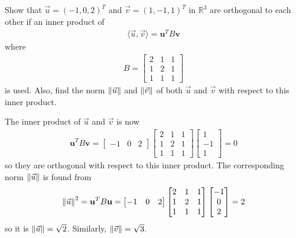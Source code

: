 \begin{Exercise}
Show that $\vec{u} = (-1,0,2)^T$ and $\vec{v} = (1,-1,1)^T$ in $\mathbb{R}^3$ are orthogonal to each other if an inner product of
\begin{align*}
\langle\vec{u}, \vec{v}\rangle = \textbf{u}^TB\textbf{v}
\end{align*}
where 
\begin{align*}
B = 
\begin{bmatrix}
2 & 1 & 1 \\
1 & 2 & 1 \\
1 & 1 & 1
\end{bmatrix}
\end{align*}
is used. Also, find the norm $\norm{\vec{u}}$ and $\norm{\vec{v}}$ of both $\vec{u}$ and $\vec{v}$ with respect to this inner product.
\end{Exercise}
\begin{Answer}
The inner product of $\vec{u}$ and $\vec{v}$ is now
\begin{align*}
\textbf{u}^TB\textbf{v} = 
\begin{bmatrix}
-1 & 0 & 2 
\end{bmatrix}
\begin{bmatrix}
2 & 1 & 1 \\
1 & 2 & 1 \\
1 & 1 & 1
\end{bmatrix}
\begin{bmatrix}
1 \\
-1 \\
1
\end{bmatrix}
= 0
\end{align*}
so they are orthogonal with respect to this inner product. The corresponding norm $\norm{\vec{u}}$ is found from
\begin{align*}
\norm{\vec{u}}^2 = \textbf{u}^TB\textbf{u} = 
\begin{bmatrix}
-1 & 0 & 2 
\end{bmatrix}
\begin{bmatrix}
2 & 1 & 1 \\
1 & 2 & 1 \\
1 & 1 & 1
\end{bmatrix}
\begin{bmatrix}
-1 \\
0 \\
2
\end{bmatrix}
= 2
\end{align*}
so it is $\norm{\vec{u}} = \sqrt{2}$. Similarly, $\norm{\vec{v}} = \sqrt{3}$.
\end{Answer}

